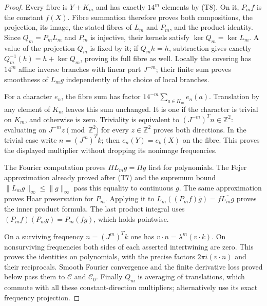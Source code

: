 \begin{proof}
Every fibre is $Y+K_m$ and has exactly $14^m$ elements by
(T8). On it, $P_mf$ is the constant $f(X)$. Fibre summation
therefore proves both compositions, the projection, its image,
the stated fibres of $L_m$ and $P_m$, and the product identity.
Since $Q_m=P_mL_m$ and $P_m$ is injective, their kernels satisfy
$\ker Q_m=\ker L_m$. A value of the projection $Q_m$ is fixed
by it; if $Q_mh=h$, subtraction gives exactly
$Q_m^{-1}(h)=h+\ker Q_m$, proving its full fibre as well.
Locally the covering has $14^m$ affine inverse branches with
linear part $J^{-m}$;
their finite sum proves smoothness of $L_mg$ independently of
the choice of local branches.

For a character $e_n$, the fibre sum has factor
$14^{-m}\sum_{a\in K_m}e_n(a)$. Translation by any element
of $K_m$ leaves this sum unchanged. It is one if the character
is trivial on $K_m$, and otherwise is zero. Triviality is
equivalent to $(J^{-m})^Tn\in\mathbb Z^2$: evaluating on
$J^{-m}z\pmod{\mathbb Z^2}$ for every $z\in\mathbb Z^2$
proves both directions. In the trivial case write
$n=(J^m)^Tk$; then $e_n(Y)=e_k(X)$ on the fibre.
This proves the displayed multiplier without dropping its
nonimage frequencies.

The Fourier computation proves $\Pi L_mg=\Pi g$ first for
polynomials. The Fejer approximation already proved after
(T7) and the supremum bound $\|L_mg\|_\infty\le\|g\|_\infty$
pass this equality to continuous $g$. The same approximation
proves Haar preservation for $P_m$. Applying it to
$L_m((P_mf)\overline g)=f\overline{L_mg}$ proves the inner
product formula. The last product integral uses
$(P_mf)(P_mg)=P_m(fg)$, which holds pointwise.

On a surviving frequency $n=(J^m)^Tk$ one has
$v\cdot n=\lambda^m(v\cdot k)$. On nonsurviving frequencies
both sides of each asserted intertwining are zero. This proves
the identities on polynomials, with the precise factors
$2\pi i(v\cdot n)$ and their reciprocals. Smooth Fourier
convergence and the finite derivative loss proved below pass
them to $\mathscr C$ and $\mathscr C_0$. Finally $Q_m$ is
averaging of translations, which commute with all these
constant-direction multipliers; alternatively use its exact
frequency projection.
\end{proof}

